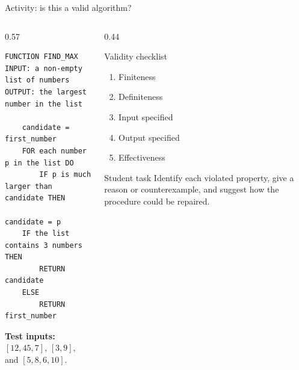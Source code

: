 \documentclass[aspectratio=169]{beamer}
\begin{document}
\begin{frame}[fragile]{Activity: is this a valid algorithm?}
  \small
  \begin{columns}[T]
    \begin{column}{0.57\textwidth}
\begin{lstlisting}[style=pseudo,basicstyle=\ttfamily]
FUNCTION FIND_MAX
INPUT: a non-empty list of numbers
OUTPUT: the largest number in the list
  
    candidate = first_number
    FOR each number p in the list DO
        IF p is much larger than candidate THEN
            candidate = p
    IF the list contains 3 numbers THEN
        RETURN candidate
    ELSE
        RETURN first_number
\end{lstlisting}
      \textbf{Test inputs:} $[12,45,7]$, $[3,9]$, and $[5,8,6,10]$.
    \end{column}
    \begin{column}{0.44\textwidth}
      \begin{block}{Validity checklist}
        \begin{enumerate}
          \item Finiteness
          \item Definiteness
          \item Input specified
          \item Output specified       
          \item Effectiveness
        \end{enumerate}
      \end{block}
      \begin{exampleblock}{Student task}
        Identify each violated property, give a reason or counterexample, and
        suggest how the procedure could be repaired.
      \end{exampleblock}
    \end{column}
  \end{columns}
\end{frame}
\end{document}

